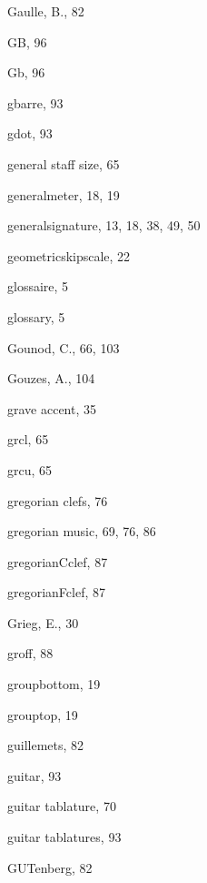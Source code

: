 \begin{theindex}
  \item {\sc Gaulle, B.}, 82
  \item {\Bslash GB}, 96
  \item {\Bslash Gb}, 96
  \item {\Bslash gbarre}, 93
  \item {\Bslash gdot}, 93
  \item general staff size, 65
  \item {\Bslash generalmeter}, 18, 19
  \item {\Bslash generalsignature}, 13, 18, 38, 49, 50
  \item {\Bslash geometricskipscale}, 22
  \item glossaire, 5
  \item glossary, 5
  \item {\sc Gounod, C.}, 66, 103
  \item {\sc Gouzes, A.}, 104
  \item grave accent, 35
  \item {\Bslash grcl}, 65
  \item {\Bslash grcu}, 65
  \item gregorian clefs, 76
  \item gregorian music, 69, 76, 86
  \item {\Bslash gregorianCclef}, 87
  \item {\Bslash gregorianFclef}, 87
  \item {\sc Grieg, E.}, 30
  \item {\Bslash groff}, 88
  \item {\Bslash groupbottom}, 19
  \item {\Bslash grouptop}, 19
  \item guillemets, 82
  \item {\Bslash guitar}, 93
  \item guitar tablature, 70
  \item guitar tablatures, 93
  \item GUTenberg, 82

  \indexspace


\end{theindex}

